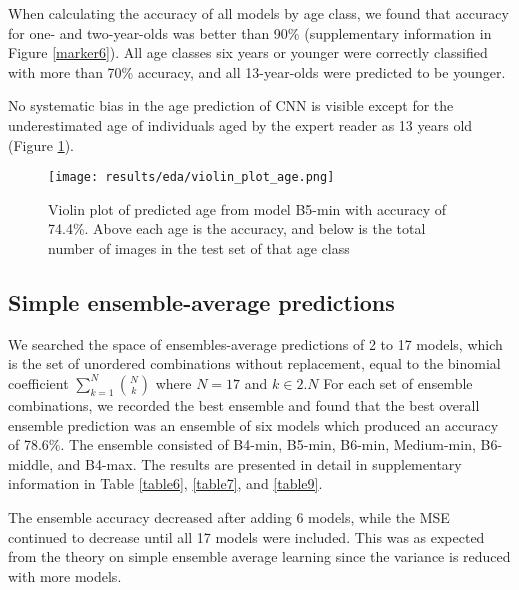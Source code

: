\documentclass[10pt,letterpaper]{article}
\begin{document}
When calculating the accuracy of all models by age class, we found that accuracy for one- and two-year-olds was better than 90\% 
(supplementary information in Figure \ref{marker6}).
All age classes six years or younger were correctly classified with more than 70\% accuracy, and all 13-year-olds were predicted to be younger.

No systematic bias in the age prediction of CNN is visible except for the underestimated age of individuals aged by the expert reader as 13 years old (Figure \ref{marker7}).

\begin{figure}[hbt!]
  \centering
  \centering
  \texttt{[image: results/eda/violin\_plot\_age.png]}
    \caption{Violin plot of predicted age from model B5-min with accuracy of 74.4\%. 
  Above each age is the accuracy, and below is the total number of images 
  in the test set of that age class}
    \label{marker7}
\end{figure}


\subsection{Simple ensemble-average predictions}

We searched the space of ensembles-average predictions
of 2 to 17 models, which is the set of unordered combinations without replacement,
equal to the binomial coefficient 
$\sum_{k=1}^{N}\binom{N}{k} $ where $N=17$ and $k \in 2.N$
For each set of ensemble combinations, we recorded the best 
ensemble and found that the best overall ensemble prediction 
was an ensemble of six models which produced an accuracy of 78.6\%. 
The ensemble consisted of B4-min, B5-min, B6-min, Medium-min, B6-middle, and B4-max.
The results are presented in detail in supplementary information in Table \ref{table6}, \ref{table7}, and \ref{table9}.

The ensemble accuracy decreased after adding 6 models, while the
MSE continued to decrease until all 17 models were included.
This was as expected from the theory on simple ensemble average learning
since the variance is reduced with more models.
\end{document}
